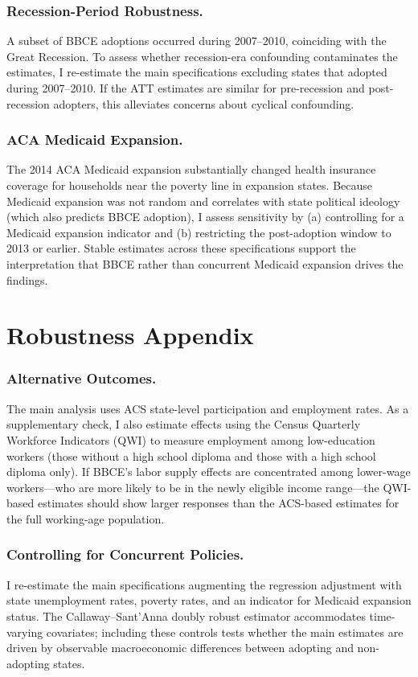\documentclass[12pt]{article}
\begin{document}
\subsubsection*{Recession-Period Robustness.} A subset of BBCE adoptions occurred during 2007--2010, coinciding with the Great Recession. To assess whether recession-era confounding contaminates the estimates, I re-estimate the main specifications excluding states that adopted during 2007--2010. If the ATT estimates are similar for pre-recession and post-recession adopters, this alleviates concerns about cyclical confounding.

\subsubsection*{ACA Medicaid Expansion.} The 2014 ACA Medicaid expansion substantially changed health insurance coverage for households near the poverty line in expansion states. Because Medicaid expansion was not random and correlates with state political ideology (which also predicts BBCE adoption), I assess sensitivity by (a) controlling for a Medicaid expansion indicator and (b) restricting the post-adoption window to 2013 or earlier. Stable estimates across these specifications support the interpretation that BBCE rather than concurrent Medicaid expansion drives the findings.

\section{Robustness Appendix}
\label{sec:robust_appendix}

\subsubsection*{Alternative Outcomes.} The main analysis uses ACS state-level participation and employment rates. As a supplementary check, I also estimate effects using the Census Quarterly Workforce Indicators (QWI) to measure employment among low-education workers (those without a high school diploma and those with a high school diploma only). If BBCE's labor supply effects are concentrated among lower-wage workers---who are more likely to be in the newly eligible income range---the QWI-based estimates should show larger responses than the ACS-based estimates for the full working-age population.

\subsubsection*{Controlling for Concurrent Policies.} I re-estimate the main specifications augmenting the regression adjustment with state unemployment rates, poverty rates, and an indicator for Medicaid expansion status. The Callaway--Sant'Anna doubly robust estimator accommodates time-varying covariates; including these controls tests whether the main estimates are driven by observable macroeconomic differences between adopting and non-adopting states.
\end{document}
